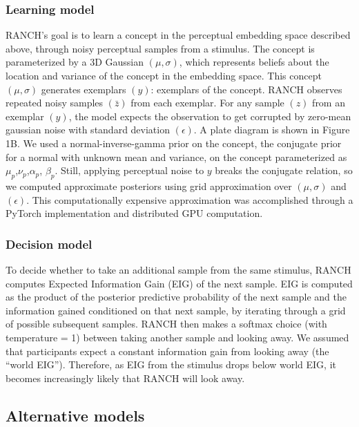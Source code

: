 \documentclass[10pt, letterpaper]{article}
\begin{document}
\hypertarget{learning-model}{%
\subsubsection{Learning model}\label{learning-model}}

RANCH's goal is to learn a concept in the perceptual embedding space
described above, through noisy perceptual samples from a stimulus. The
concept is parameterized by a 3D Gaussian \((\mu,\sigma)\), which
represents beliefs about the location and variance of the concept in the
embedding space. This concept \((\mu,\sigma)\) generates exemplars
\((y)\): exemplars of the concept. RANCH observes repeated noisy samples
\((\bar{z})\) from each exemplar. For any sample \((z)\) from an
exemplar \((y)\), the model expects the observation to get corrupted by
zero-mean gaussian noise with standard deviation \((\epsilon)\). A plate
diagram is shown in Figure 1B. We used a normal-inverse-gamma prior on
the concept, the conjugate prior for a normal with unknown mean and
variance, on the concept parameterized as
\(\mu_{p}\),\(\nu_{p}\),\(\alpha_{p}\), \(\beta_{p}\). Still, applying
perceptual noise to \(y\) breaks the conjugate relation, so we computed
approximate posteriors using grid approximation over \((\mu,\sigma)\)
and \((\epsilon)\). This computationally expensive approximation was
accomplished through a PyTorch implementation and distributed GPU
computation.

\hypertarget{decision-model}{%
\subsubsection{Decision model}\label{decision-model}}

To decide whether to take an additional sample from the same stimulus,
RANCH computes Expected Information Gain (EIG) of the next sample. EIG
is computed as the product of the posterior predictive probability of
the next sample and the information gained conditioned on that next
sample, by iterating through a grid of possible subsequent samples.
RANCH then makes a softmax choice (with temperature = 1) between taking
another sample and looking away. We assumed that participants expect a
constant information gain from looking away (the ``world EIG'').
Therefore, as EIG from the stimulus drops below world EIG, it becomes
increasingly likely that RANCH will look away.

\hypertarget{alternative-models}{%
\subsection{Alternative models}\label{alternative-models}}
\end{document}
